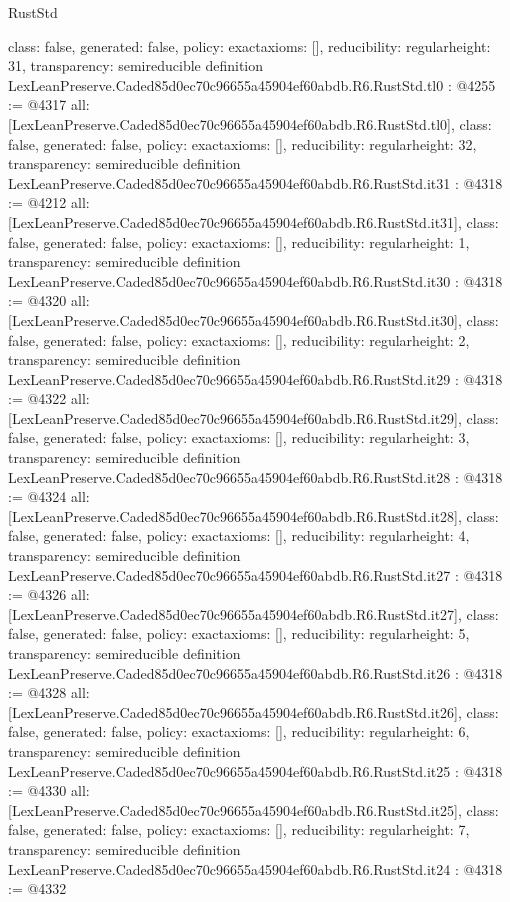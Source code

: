 \begin{lexlean}{RustStd}
\begin{coremodule}
{  class: false,
  generated: false,
  policy: exact{axioms: []},
  reducibility: regular{height: 31},
  transparency: semireducible
}
definition LexLeanPreserve.Caded85d0ec70c96655a45904ef60abdb.R6.RustStd.tl0 : @4255 := @4317 {
  all: [LexLeanPreserve.Caded85d0ec70c96655a45904ef60abdb.R6.RustStd.tl0],
  class: false,
  generated: false,
  policy: exact{axioms: []},
  reducibility: regular{height: 32},
  transparency: semireducible
}
definition LexLeanPreserve.Caded85d0ec70c96655a45904ef60abdb.R6.RustStd.it31 : @4318 := @4212 {
  all: [LexLeanPreserve.Caded85d0ec70c96655a45904ef60abdb.R6.RustStd.it31],
  class: false,
  generated: false,
  policy: exact{axioms: []},
  reducibility: regular{height: 1},
  transparency: semireducible
}
definition LexLeanPreserve.Caded85d0ec70c96655a45904ef60abdb.R6.RustStd.it30 : @4318 := @4320 {
  all: [LexLeanPreserve.Caded85d0ec70c96655a45904ef60abdb.R6.RustStd.it30],
  class: false,
  generated: false,
  policy: exact{axioms: []},
  reducibility: regular{height: 2},
  transparency: semireducible
}
definition LexLeanPreserve.Caded85d0ec70c96655a45904ef60abdb.R6.RustStd.it29 : @4318 := @4322 {
  all: [LexLeanPreserve.Caded85d0ec70c96655a45904ef60abdb.R6.RustStd.it29],
  class: false,
  generated: false,
  policy: exact{axioms: []},
  reducibility: regular{height: 3},
  transparency: semireducible
}
definition LexLeanPreserve.Caded85d0ec70c96655a45904ef60abdb.R6.RustStd.it28 : @4318 := @4324 {
  all: [LexLeanPreserve.Caded85d0ec70c96655a45904ef60abdb.R6.RustStd.it28],
  class: false,
  generated: false,
  policy: exact{axioms: []},
  reducibility: regular{height: 4},
  transparency: semireducible
}
definition LexLeanPreserve.Caded85d0ec70c96655a45904ef60abdb.R6.RustStd.it27 : @4318 := @4326 {
  all: [LexLeanPreserve.Caded85d0ec70c96655a45904ef60abdb.R6.RustStd.it27],
  class: false,
  generated: false,
  policy: exact{axioms: []},
  reducibility: regular{height: 5},
  transparency: semireducible
}
definition LexLeanPreserve.Caded85d0ec70c96655a45904ef60abdb.R6.RustStd.it26 : @4318 := @4328 {
  all: [LexLeanPreserve.Caded85d0ec70c96655a45904ef60abdb.R6.RustStd.it26],
  class: false,
  generated: false,
  policy: exact{axioms: []},
  reducibility: regular{height: 6},
  transparency: semireducible
}
definition LexLeanPreserve.Caded85d0ec70c96655a45904ef60abdb.R6.RustStd.it25 : @4318 := @4330 {
  all: [LexLeanPreserve.Caded85d0ec70c96655a45904ef60abdb.R6.RustStd.it25],
  class: false,
  generated: false,
  policy: exact{axioms: []},
  reducibility: regular{height: 7},
  transparency: semireducible
}
definition LexLeanPreserve.Caded85d0ec70c96655a45904ef60abdb.R6.RustStd.it24 : @4318 := @4332 {
}
\end{coremodule}
\end{lexlean}
